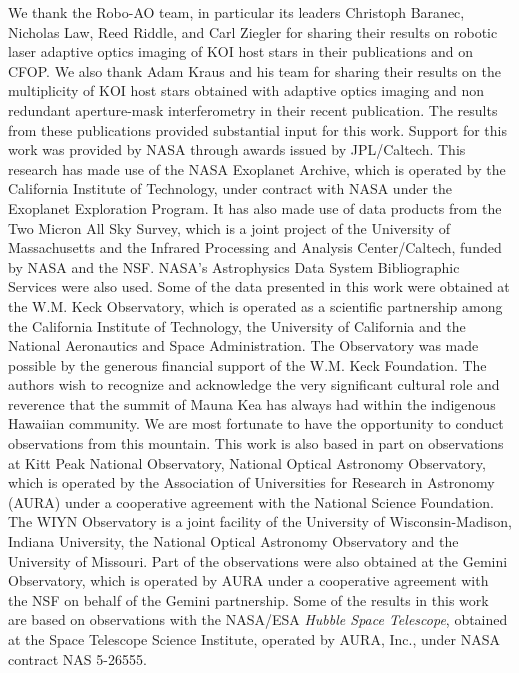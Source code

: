 \documentclass[twocolumn,appendixfloats]{aastex6}
\begin{document}
\acknowledgments
We thank the Robo-AO team, in particular its leaders Christoph Baranec,
Nicholas Law, Reed Riddle, and Carl Ziegler for sharing their results on 
robotic laser adaptive optics imaging of KOI host stars in their publications 
and on CFOP.
We also thank Adam Kraus and his team for sharing their results on the 
multiplicity of KOI host stars obtained with adaptive optics imaging and 
non redundant aperture-mask interferometry in their recent publication.
The results from these publications provided substantial input for this work.
Support for this work was provided by NASA through awards issued by
JPL/Caltech.
This research has made use of the NASA Exoplanet Archive, which is operated 
by the California Institute of Technology, under contract with NASA under the 
Exoplanet Exploration Program.
It has also made use of data products from the Two Micron All Sky Survey, which 
is a joint project of the University of Massachusetts and the Infrared Processing 
and Analysis Center/Caltech, funded by NASA and the NSF. NASA's Astrophysics 
Data System Bibliographic Services were also used.
Some of the data presented in this work were obtained at the W.M. Keck Observatory, 
which is operated as a scientific partnership among the California Institute of 
Technology, the University of California and the National Aeronautics and Space 
Administration. The Observatory was made possible by the generous financial 
support of the W.M. Keck Foundation. The authors wish to recognize and 
acknowledge the very significant cultural role and reverence that the summit 
of Mauna Kea has always had within the indigenous Hawaiian community.  
We are most fortunate to have the opportunity to conduct observations from 
this mountain. 
This work is also based in part on observations at Kitt Peak National Observatory, 
National Optical Astronomy Observatory, which is operated by the Association 
of Universities for Research in Astronomy (AURA) under a cooperative agreement 
with the National Science Foundation. The WIYN Observatory is a joint facility of 
the University of Wisconsin-Madison, Indiana University, the National Optical 
Astronomy Observatory and the University of Missouri. 
Part of the observations were also obtained at the Gemini Observatory, which is 
operated by AURA under a cooperative agreement with the NSF on behalf of 
the Gemini partnership.
Some of the results in this work are based on observations with the NASA/ESA 
{\it Hubble Space Telescope}, obtained at the Space Telescope Science Institute, 
operated by AURA, Inc., under NASA contract NAS 5-26555.
\end{document}
